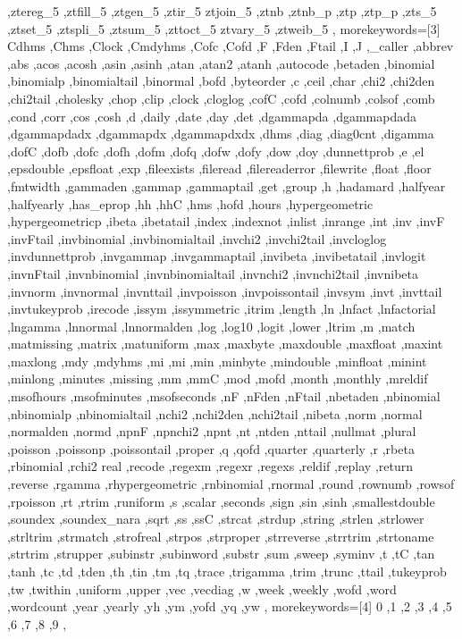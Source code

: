 {{    ,ztereg_5 ,ztfill_5 ,ztgen_5 ,ztir_5 ztjoin_5 ,ztnb ,ztnb_p ,ztp
    ,ztp_p ,zts_5 ,ztset_5 ,ztspli_5 ,ztsum_5 ,zttoct_5 ztvary_5
    ,ztweib_5
  },
  morekeywords=[3]{
    Cdhms ,Chms ,Clock ,Cmdyhms ,Cofc ,Cofd ,F ,Fden ,Ftail ,I ,J
    ,_caller ,abbrev ,abs ,acos ,acosh ,asin ,asinh ,atan ,atan2
    ,atanh ,autocode ,betaden ,binomial ,binomialp ,binomialtail
    ,binormal ,bofd ,byteorder ,c ,ceil ,char ,chi2 ,chi2den ,chi2tail
    ,cholesky ,chop ,clip ,clock ,cloglog ,cofC ,cofd ,colnumb ,colsof
    ,comb ,cond ,corr ,cos ,cosh ,d ,daily ,date ,day ,det ,dgammapda
    ,dgammapdada ,dgammapdadx ,dgammapdx ,dgammapdxdx ,dhms ,diag
    ,diag0cnt ,digamma ,dofC ,dofb ,dofc ,dofh ,dofm ,dofq ,dofw ,dofy
    ,dow ,doy ,dunnettprob ,e ,el ,epsdouble ,epsfloat ,exp ,fileexists
    ,fileread ,filereaderror ,filewrite ,float ,floor ,fmtwidth
    ,gammaden ,gammap ,gammaptail ,get ,group ,h ,hadamard ,halfyear
    ,halfyearly ,has_eprop ,hh ,hhC ,hms ,hofd ,hours ,hypergeometric
    ,hypergeometricp ,ibeta ,ibetatail ,index ,indexnot ,inlist
    ,inrange ,int ,inv ,invF ,invFtail ,invbinomial ,invbinomialtail
    ,invchi2 ,invchi2tail ,invcloglog ,invdunnettprob ,invgammap
    ,invgammaptail ,invibeta ,invibetatail ,invlogit ,invnFtail
    ,invnbinomial ,invnbinomialtail ,invnchi2 ,invnchi2tail ,invnibeta
    ,invnorm ,invnormal ,invnttail ,invpoisson ,invpoissontail ,invsym
    ,invt ,invttail ,invtukeyprob ,irecode ,issym ,issymmetric ,itrim
    ,length ,ln ,lnfact ,lnfactorial ,lngamma ,lnnormal ,lnnormalden
    ,log ,log10 ,logit ,lower ,ltrim ,m ,match ,matmissing ,matrix
    ,matuniform ,max ,maxbyte ,maxdouble ,maxfloat ,maxint ,maxlong ,mdy
    ,mdyhms ,mi ,mi ,min ,minbyte ,mindouble ,minfloat ,minint ,minlong
    ,minutes ,missing ,mm ,mmC ,mod ,mofd ,month ,monthly ,mreldif
    ,msofhours ,msofminutes ,msofseconds ,nF ,nFden ,nFtail ,nbetaden
    ,nbinomial ,nbinomialp ,nbinomialtail ,nchi2 ,nchi2den ,nchi2tail
    ,nibeta ,norm ,normal ,normalden ,normd ,npnF ,npnchi2 ,npnt ,nt
    ,ntden ,nttail ,nullmat ,plural ,poisson ,poissonp ,poissontail
    ,proper ,q ,qofd ,quarter ,quarterly ,r ,rbeta ,rbinomial ,rchi2
    real ,recode ,regexm ,regexr ,regexs ,reldif ,replay ,return
    ,reverse ,rgamma ,rhypergeometric ,rnbinomial ,rnormal ,round
    ,rownumb ,rowsof ,rpoisson ,rt ,rtrim ,runiform ,s ,scalar ,seconds
    ,sign ,sin ,sinh ,smallestdouble ,soundex ,soundex_nara ,sqrt ,ss
    ,ssC ,strcat ,strdup ,string ,strlen ,strlower ,strltrim ,strmatch
    ,strofreal ,strpos ,strproper ,strreverse ,strrtrim ,strtoname
    ,strtrim ,strupper ,subinstr ,subinword ,substr ,sum ,sweep ,syminv
    ,t ,tC ,tan ,tanh ,tc ,td ,tden ,th ,tin ,tm ,tq ,trace ,trigamma
    ,trim ,trunc ,ttail ,tukeyprob ,tw ,twithin ,uniform ,upper ,vec
    ,vecdiag ,w ,week ,weekly ,wofd ,word ,wordcount ,year ,yearly
    ,yh ,ym ,yofd ,yq ,yw
  },
  morekeywords=[4]{
    0 ,1 ,2 ,3 ,4 ,5 ,6 ,7 ,8 ,9
  },
}

